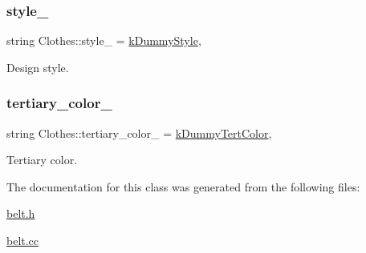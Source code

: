 \subsubsection{\texorpdfstring{style\+\_\+}{style\_}}
{\footnotesize\ttfamily string Clothes\+::style\+\_\+ = \mbox{\hyperlink{clothes_8h_a9deec6ed1f40928bfa0040eeab95ed6b}{k\+Dummy\+Style}}\hspace{0.3cm}{\ttfamily [protected]}, {\ttfamily [inherited]}}



Design style. 

\mbox{\label{classClothes_a3c5f1e7ab531e3ba7a38b930da8078a0}} 
\subsubsection{\texorpdfstring{tertiary\+\_\+color\+\_\+}{tertiary\_color\_}}
{\footnotesize\ttfamily string Clothes\+::tertiary\+\_\+color\+\_\+ = \mbox{\hyperlink{clothes_8h_a094dde85547895fd70dafb3ab10c6783}{k\+Dummy\+Tert\+Color}}\hspace{0.3cm}{\ttfamily [protected]}, {\ttfamily [inherited]}}



Tertiary color. 



The documentation for this class was generated from the following files\+:\begin{DoxyCompactItemize}
\item 
\mbox{\hyperlink{belt_8h}{belt.\+h}}\item 
\mbox{\hyperlink{belt_8cc}{belt.\+cc}}\end{DoxyCompactItemize}
